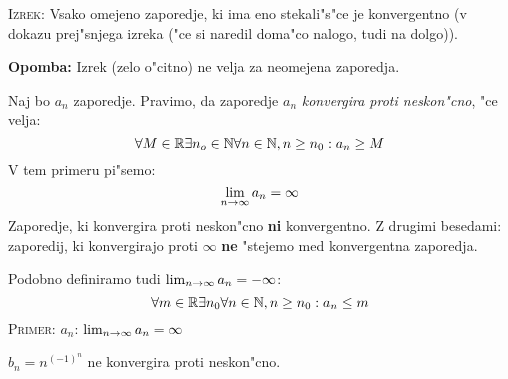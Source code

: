 \textsc{Izrek:} Vsako omejeno zaporedje, ki ima eno stekali"s"ce je konvergentno (v dokazu prej"snjega izreka ("ce si naredil doma"co nalogo, tudi na dolgo)).

\textbf{Opomba:} Izrek (zelo o"citno) ne velja za neomejena zaporedja.

 Naj bo $a_n$ zaporedje. Pravimo, da zaporedje $a_n$ \emph{konvergira proti neskon"cno}, "ce velja:
\begin{equation*}
\forall M \in \mathbb{R} \exists n_o \in \mathbb{N} \forall n \in \mathbb{N}, n \geq n_0: a_n \geq M
\end{equation*}
V tem primeru pi"semo:
\begin{equation*}
\lim_{n \rightarrow \infty} a_n = \infty
\end{equation*}
%
Zaporedje, ki konvergira proti neskon"cno \textbf{ni} konvergentno. Z drugimi besedami: zaporedij, ki konvergirajo proti $\infty$ \textbf{ne} "stejemo med konvergentna zaporedja.

Podobno definiramo tudi $\lim_{n \rightarrow \infty} a_n = -\infty$:
\begin{equation*}
\forall m \in \mathbb{R} \exists n_0 \forall n \in \mathbb{N}, n \geq n_0: a_n \leq m
\end{equation*}
\textsc{Primer:} $a_n$: $\lim_{n \rightarrow \infty} a_n = \infty$

$b_n = n^{(-1)^n}$ ne konvergira proti neskon"cno.

